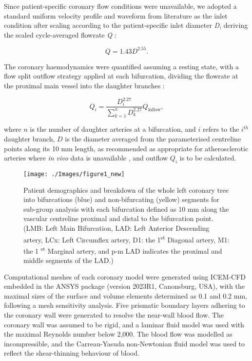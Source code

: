 \documentclass[preprint,11pt,review]{elsarticle}
\begin{document}
Since patient-specific coronary flow conditions were unavailable, we adopted a standard uniform velocity profile and waveform from literature \cite{Vlachopoulos2011McDonald's} as the inlet condition after scaling according to the patient-specific inlet diameter \textit{D}, deriving the scaled cycle-averaged flowrate \textit{Q} \cite{Giessen2011influence}:

\begin{equation}
    Q=1.43D^{2.55}.  
\end{equation}

The coronary haemodynamics were quantified assuming a resting state, with a flow split outflow strategy applied at each bifurcation, dividing the flowrate at the proximal main vessel into the daughter branches \cite{Giessen2011influence}:

\begin{equation}
    Q_i=\frac{D_i^{2.27}}{\sum_{k=1}^n D_k^{2.27} }Q_{\text{inflow}},  
\end{equation}

where $n$ is the number of daughter arteries at a bifurcation, and $i$ refers to the $i^{th}$ daughter branch, $D$ is the diameter averaged from the parameterised centreline points along its 10 mm length, as recommended as appropriate for atherosclerotic arteries where \textit{in vivo} data is unavailable \cite{schrauwen2016impact}, and outflow $Q_i$ is to be calculated. 

\begin{figure}
    \centering
    \texttt{[image: ./Images/figure1\_new]}
    \caption{Patient demographics and breakdown of the whole left coronary tree into bifurcations (blue) and non-bifurcating (yellow) segments for sub-group analysis with each bifurcation defined as 10 mm along the vascular centreline proximal and distal to the bifurcation point. (LMB: Left Main Bifurcation, LAD: Left Anterior Descending artery, LCx: Left Circumflex artery, D1: the 1\textsuperscript{st} Diagonal artery, M1: the 1 \textsuperscript{st} Marginal artery, and p-m LAD indicates the proximal and middle segments of the LAD.)}
    \label{fig:breakdown}
\end{figure}

Computational meshes of each coronary model were generated using ICEM-CFD embedded in the ANSYS package (version 2023R1,  Canonsburg, USA), with the maximal sizes of the surface and volume elements determined as 0.1 and 0.2 mm, following a mesh sensitivity analysis. Five prismatic boundary layers adhering to the coronary wall were generated to resolve the near-wall blood flow. The coronary wall was assumed to be rigid, and a laminar fluid model was used with the maximal Reynolds number below 2,000.  The blood flow was modelled as incompressible, and the Carreau-Yasuda non-Newtonian fluid model \cite{Razavi2011Numerical} was used to reflect the shear-thinning behaviour of blood. 
\end{document}
